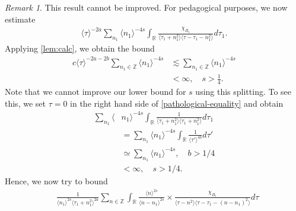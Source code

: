 \documentclass[12pt,reqno]{amsart}
\numberwithin{equation}{section}  %
\numberwithin{figure}{section}
\newcommand{\rr}{\mathbb{R}}
\newcommand{\zz}{\mathbb{Z}}
\theoremstyle{plain}
\theoremstyle{definition}
\theoremstyle{remark}
\newtheorem{remark}{Remark}
\begin{document}
\begin{framed}
  \begin{remark}
    This result cannot be improved. For pedagogical purposes, we now estimate 
%
%
\begin{equation}
  \label{pathological-equality}
\begin{split}
   \langle \tau \rangle ^{-2a} \sum_{n_{1}} \langle
  n_{1}\rangle ^{-4s} \int_{\rr} \frac{\chi_{B_{1}}}{\langle \tau_{1} + n_{1}^{2} \rangle \langle
  \tau - \tau_{1} - n_{1}^{2}\rangle }d \tau_{1}.
\end{split}
\end{equation}
Applying \autoref{lem:calc}, we obtain the bound
%
%
\begin{equation*}
\begin{split}
  c  \langle \tau \rangle
  ^{-2a-2b} \sum_{n_{1} \in \zz} \langle n_{1} \rangle
  ^{-4s} 
  & \lesssim \sum_{n_{1} \in \zz} \langle n_{1} \rangle ^{-4s}
  \\
  & < \infty, \quad s > \frac{1}{4}.
\end{split}
\end{equation*}
%
%
Note that we cannot improve our lower bound for $s$ using this splitting.
To see this, we set $\tau = 0$
in the right hand side of \eqref{pathological-equality} and obtain
%
%
\newpage
%
\begin{equation*}
\begin{split}
   \sum_{n_{1}} \langle
  & n_{1}\rangle ^{-4s} \int_{\rr} \frac{1}{\langle \tau_{1} + n_{1}^{2} \rangle \langle
   \tau_{1} + n_{1}^{2}\rangle }d \tau_{1} 
   \\
   & = \sum_{n_{1}} \langle
  n_{1}\rangle ^{-4s} \int_{\rr} \frac{1}{\langle
   \tau' \rangle ^{4b}}d \tau'
   \\
   & \simeq \sum_{n_{1}} \langle n_{1} \rangle ^{-4s}, \quad b > 1/4
   \\
   & < \infty, \quad s > 1/4.
\end{split}
\end{equation*}
%
%
%
Hence, we now try to bound
\begin{equation}
\begin{split}
  & \frac{1}{\langle n_{1} \rangle ^{2s}
  \langle \tau_{1} + n_{1}^{2} \rangle
  ^{2a}} \sum_{n \in \zz } \int_{\rr} \frac{\langle n \rangle ^{2s}}{\langle
  n - n_{1}\rangle ^{2s}}  \times \frac{\chi_{B_{1}}}{\langle
  \tau - n^{2}  \rangle  \langle \tau - \tau_{1} - (n - n_{1})^{2}
  \rangle } d \tau 
\end{split}
\end{equation}

\end{remark}
\end{framed}
\end{document}
